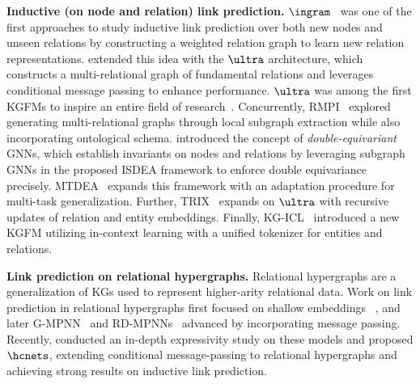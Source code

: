 \textbf{Inductive (on node and relation) link prediction.}
$\ingram$~\citep{ingram} was one of the first approaches to study inductive link prediction over both new nodes and unseen relations by constructing a weighted relation graph to learn new relation representations. \citet{galkin2023ultra} extended this idea with the $\ultra$ architecture, which constructs a multi-relational graph of fundamental relations and leverages conditional message passing to enhance performance. $\ultra$ was among the first KGFMs to inspire an entire field of research~\citep{mao2024positiongraphfoundationmodels}. Concurrently, RMPI~\citep{geng2022relationalmessagepassingfully} explored generating multi-relational graphs through local subgraph extraction while also incorporating ontological schema. 
%
\citet{gao2023double} introduced the concept of \emph{double-equivariant} GNNs, which establish invariants on nodes and relations by leveraging subgraph GNNs in the proposed ISDEA framework to enforce double equivariance precisely. MTDEA~\citep{zhou2023multitaskperspetivelinkprediction} 
expands this framework %
with an adaptation procedure for multi-task generalization.
%
Further, TRIX~\citep{zhang2024trix}  expands on $\ultra$ with recursive updates of relation and entity embeddings. 
Finally, KG-ICL~\citep{cui2024prompt} introduced a new KGFM utilizing in-context learning with a unified tokenizer for entities and relations. 
%

\textbf{Link prediction on relational hypergraphs.} 
Relational hypergraphs 
are a generalization of KGs used to 
represent higher-arity relational data.
Work on link prediction in relational hypergraphs first focused on shallow embeddings
~\citep{wen2016representation, liu2020tensor, fatemi2020knowledge}, and later %
G-MPNN~\citep{yadati2020gmpnn} and RD-MPNNs~\citep{zhou2023rdmpnn} %
advanced by  
incorporating message passing.
Recently, \citet{huang2024link} conducted an in-depth expressivity study on these models and proposed $\hcnets$, extending conditional message-passing to relational hypergraphs and achieving strong results on inductive link prediction.